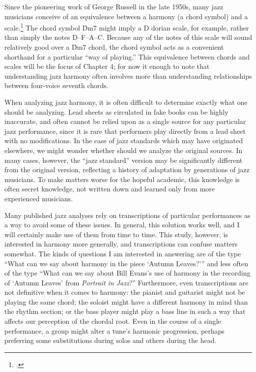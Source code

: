 \documentclass[diss]{subfiles}
\begin{document}
Since the pioneering work of George Russell in the late 1950s, many jazz
musicians conceive of an equivalence between a harmony (a chord symbol) and a
scale.\footcite{russell:lcc} The chord symbol \h{Dm7} might imply a D dorian
scale, for example, rather than simply the notes D--F--A--C. Because any of
the notes of this scale will sound relatively good over a \h{Dm7} chord, the
chord symbol acts as a convenient shorthand for a particular “way of playing.”
This equivalence between chords and scales will be the focus of Chapter 4; for
now it enough to note that understanding jazz harmony often involves more than
understanding relationships between four-voice seventh chords.

When analyzing jazz harmony, it is often difficult to determine exactly what
one should be analyzing. Lead sheets as circulated in fake books can be highly
inaccurate, and often cannot be relied upon as a single source for any
particular jazz performance, since it is rare that performers play directly
from a lead sheet with no modifications. In the case of jazz
standards which may have originated elsewhere, we might wonder whether should
we analyze the original sources. In many cases, however, the “jazz standard”
version may be significantly different from the original version, reflecting a
history of adaptation by generations of jazz musicians. To make
matters worse for the hopeful academic, this knowledge is often secret
knowledge, not written down and learned only from more experienced musicians.

Many published jazz analyses rely on transcriptions of particular performances
as a way to avoid some of these issues. In general, this solution works well,
and I will certainly make use of them from time to time. This study, however,
is interested in harmony more generally, and transcriptions can confuse
matters somewhat. The kinds of questions I am interested in answering are of
the type “What can we say about harmony in the piece ‘Autumn Leaves?’” and
less often of the type “What can we say about Bill Evans’s use of harmony in
the recording of ‘Autumn Leaves’ from \emph{Portrait in Jazz}?” Furthermore,
even transcriptions are not definitive when it comes to harmony: the pianist
and guitarist might not be playing the same chord; the soloist might have a
different harmony in mind than the rhythm section; or the bass player might
play a bass line in such a way that affects our perception of the chordal
root. Even in the course of a single performance, a group might alter a tune’s
harmonic progression, perhaps preferring some substitutions during solos and
others during the head.
\end{document}
